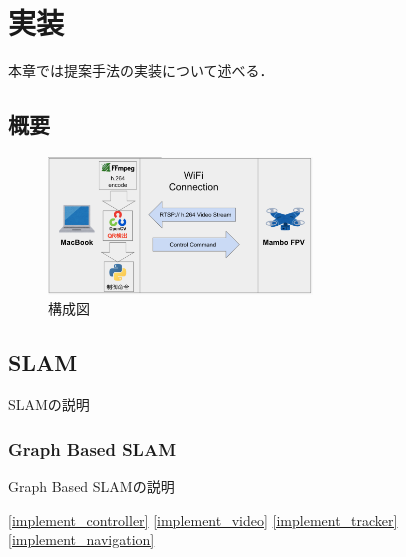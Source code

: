\chapter{実装}
\label{implementation}

本章では提案手法の実装について述べる．

\section{概要}
\begin{figure}[htbp]
  \begin{center}
    \includegraphics[clip,width=7.0cm]{img/sys-struct.png}
    \caption{構成図}
    \label{fig:struct}
  \end{center}
\end{figure}

\section{SLAM}
\label{slam}

SLAMの説明

\subsection{Graph Based SLAM}

Graph Based SLAMの説明

\ref{implement_controller}
\ref{implement_video}
\ref{implement_tracker}
\ref{implement_navigation}







